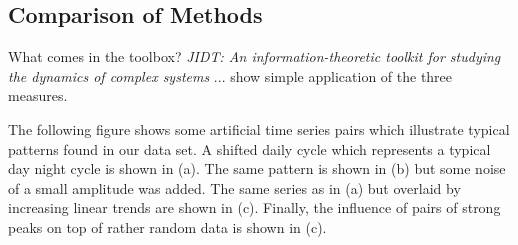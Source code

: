 \documentclass[a4paper,10pt]{scrbook}
\begin{document}
%
%
 
\subsection{Comparison of Methods}


What comes in the toolbox? \textit{JIDT: An information-theoretic toolkit for studying the dynamics of complex systems} \cite{Lizier2014} ... show simple application of the three measures.


The following figure shows some artificial time series pairs which illustrate typical patterns found in our data set. A shifted daily cycle which represents a typical day night cycle is shown in (a). The same pattern is shown in (b) but some noise of a small amplitude was added. The same series as in (a) but overlaid by increasing linear trends are shown in (c). Finally, the influence of pairs of strong peaks on top of rather random data is shown in (c). 
\end{document}
